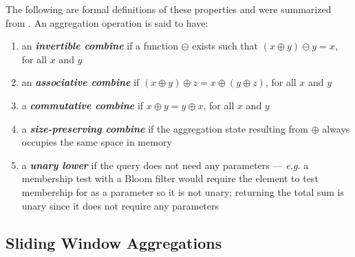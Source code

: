 The following are formal definitions of these properties and were summarized from \cite{Tangwongsan-Sliding-Window-Aggregation-Algorithms}. An aggregation operation is said to have:

\begin{enumerate}
    \item  an \textbf{\textit{invertible combine}} if a function $\ominus$ exists such that $(x \oplus y) \ominus y = x$, for all $x$ and $y$
    
    \item  an \textbf{\textit{associative combine}} if $(x \oplus y) \oplus z = x \oplus (y \oplus z)$, for all $x$ and $y$
    
    \item  a \textbf{\textit{commutative combine}} if $x \oplus y = y \oplus x$, for all $x$ and $y$
    
    \item  a \textbf{\textit{size-preserving combine}} if the aggregation state resulting from $\oplus$ always occupies the same space in memory
   
    \item  a \textbf{\textit{unary lower}} if the query does not need any parameters --- \textit{e.g.} a membership test with a Bloom filter would require the element to test membership for as a parameter so it is not unary; returning the total sum is unary since it does not require any parameters
\end{enumerate}


\subsection{Sliding Window Aggregations}

